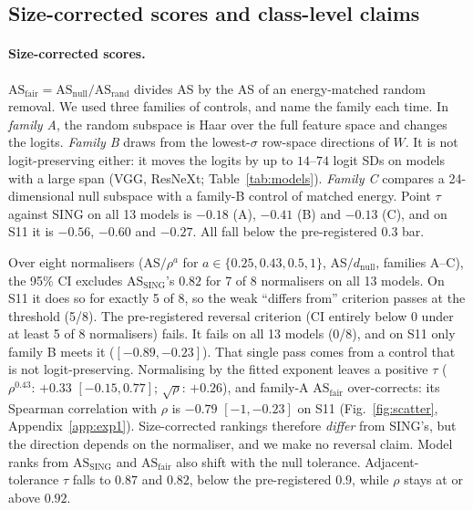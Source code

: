 \documentclass[10pt]{article}
\newcommand{\ASS}{\mathrm{AS}_{\mathrm{SING}}}
\newcommand{\ASF}{\mathrm{AS}_{\mathrm{fair}}}
\begin{document}
\subsection{Size-corrected scores and class-level claims}
\label{app:fair}
\paragraph{Size-corrected scores.}
$\ASF=\mathrm{AS}_{\mathrm{null}}/\mathrm{AS}_{\mathrm{rand}}$ divides AS by the AS of an energy-matched random removal.
We used three families of controls, and name the family each time.
In \emph{family A}, the random subspace is Haar over the full feature space and changes the logits.
\emph{Family B} draws from the lowest-$\sigma$ row-space directions of $W$.
It is not logit-preserving either: it moves the logits by up to $14$--$74$ logit SDs on models with a large span (VGG, ResNeXt; Table~\ref{tab:models}).
\emph{Family C} compares a 24-dimensional null subspace with a family-B control of matched energy.
Point $\tau$ against SING on all 13 models is $-0.18$ (A), $-0.41$ (B) and $-0.13$ (C), and on S11 it is $-0.56$, $-0.60$ and $-0.27$.
All fall below the pre-registered $0.3$ bar.

Over eight normalisers (AS$/\rho^{a}$ for $a\in\{0.25,0.43,0.5,1\}$, AS$/d_{\mathrm{null}}$, families A--C), the 95\% CI excludes $\ASS$'s $0.82$ for 7 of 8 normalisers on all 13 models.
On S11 it does so for exactly 5 of 8, so the weak ``differs from'' criterion passes at the threshold (5/8).
The pre-registered reversal criterion (CI entirely below 0 under at least 5 of 8 normalisers) fails.
It fails on all 13 models (0/8), and on S11 only family B meets it ($[-0.89,-0.23]$).
That single pass comes from a control that is not logit-preserving.
Normalising by the fitted exponent leaves a positive $\tau$ ($\rho^{0.43}$: $+0.33$ $[-0.15,0.77]$; $\sqrt\rho$: $+0.26$), and family-A $\ASF$ over-corrects: its Spearman correlation with $\rho$ is $-0.79$ $[-1,-0.23]$ on S11 (Fig.~\ref{fig:scatter}, Appendix~\ref{app:exp1}).
Size-corrected rankings therefore \emph{differ} from SING's, but the direction depends on the normaliser, and we make no reversal claim.
Model ranks from $\ASS$ and $\ASF$ also shift with the null tolerance.
Adjacent-tolerance $\tau$ falls to $0.87$ and $0.82$, below the pre-registered $0.9$, while $\rho$ stays at or above $0.92$.
\end{document}
